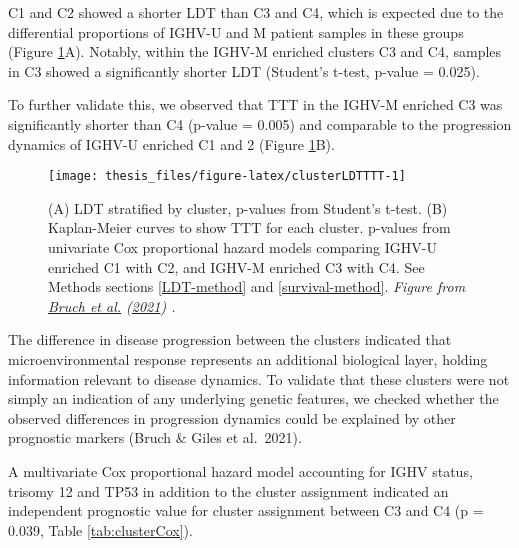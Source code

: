 \documentclass[11pt, a4paper, twosided]{book}
\begin{document}
C1 and C2 showed a shorter LDT than C3 and C4, which is expected due to the differential proportions of IGHV-U and M patient samples in these groups (Figure \ref{fig:clusterLDTTTT}A). Notably, within the IGHV-M enriched clusters C3 and C4, samples in C3 showed a significantly shorter LDT (Student's t-test, p-value = 0.025).

To further validate this, we observed that TTT in the IGHV-M enriched C3 was significantly shorter than C4 (p-value = 0.005) and comparable to the progression dynamics of IGHV-U enriched C1 and 2 (Figure \ref{fig:clusterLDTTTT}B).


\begin{figure}

{\centering \texttt{[image: thesis\_files/figure-latex/clusterLDTTTT-1]} 

}

\caption{(A) LDT stratified by cluster, p-values from Student's t-test. (B) Kaplan-Meier curves to show TTT for each cluster. p-values from univariate Cox proportional hazard models comparing IGHV-U enriched C1 with C2, and IGHV-M enriched C3 with C4. See Methods sections \ref{LDT-method} and \ref{survival-method}. \emph{Figure from \protect\hyperlink{ref-Giles2021}{Bruch et al.} (\protect\hyperlink{ref-Giles2021}{2021}) .}}\label{fig:clusterLDTTTT}
\end{figure}
The difference in disease progression between the clusters indicated that microenvironmental response represents an additional biological layer, holding information relevant to disease dynamics. To validate that these clusters were not simply an indication of any underlying genetic features, we checked whether the observed differences in progression dynamics could be explained by other prognostic markers (Bruch \& Giles et al.~2021).

A multivariate Cox proportional hazard model accounting for IGHV status, trisomy 12 and TP53 in addition to the cluster assignment indicated an independent prognostic value for cluster assignment between C3 and C4 (p = 0.039, Table \ref{tab:clusterCox}).
\end{document}
